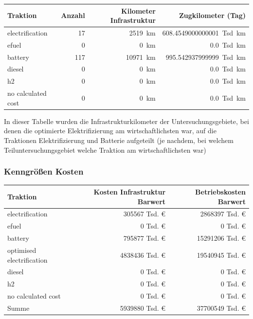 \begin{center}
	\begin{tabularx}{\textwidth}{X | r | r | r} Traktion & Anzahl & Kilometer Infrastruktur & Zugkilometer (Tag) \\
	\hline
            electrification & \num{17} &  \SI{2519}{\km} & \SI{608.4549000000001}{Tsd. \km}\\
            efuel & \num{0} &  \SI{0}{\km} & \SI{0.0}{Tsd. \km}\\
            battery & \num{117} &  \SI{10971}{\km} & \SI{995.542937999999}{Tsd. \km}\\
            diesel & \num{0} &  \SI{0}{\km} & \SI{0.0}{Tsd. \km}\\
            h2 & \num{0} &  \SI{0}{\km} & \SI{0.0}{Tsd. \km}\\
            no calculated cost & \num{0} &  \SI{0}{\km} & \SI{0.0}{Tsd. \km}\\
    	\end{tabularx}
\end{center}
In dieser Tabelle wurden die Infrastrukturkilometer der Untersuchungsgebiete, bei denen die optimierte Elektrifizierung am wirtschaftlichsten war, auf die Traktionen Elektrifizierung und Batterie aufgeteilt (je nachdem, bei welchem Teiluntersuchungsgebiet welche Traktion am wirtschaftlichsten war)

\subsubsection{Kenngrößen Kosten}

\begin{center}
	\begin{tabularx}{\textwidth}{X | r | r} Traktion & Kosten Infrastruktur Barwert & Betriebskosten Barwert\\
	\hline
            electrification & \num{305567} Tsd. € &  \num{2868397} Tsd. €\\
            efuel & \num{0} Tsd. € &  \num{0} Tsd. €\\
            battery & \num{795877} Tsd. € &  \num{15291206} Tsd. €\\
            optimised electrification & \num{4838436} Tsd. € &  \num{19540945} Tsd. €\\
            diesel & \num{0} Tsd. € &  \num{0} Tsd. €\\
            h2 & \num{0} Tsd. € &  \num{0} Tsd. €\\
            no calculated cost & \num{0} Tsd. € &  \num{0} Tsd. €\\
    	\hline
		Summe & \num{5939880} Tsd. € & \num{37700549} Tsd. €
	\end{tabularx}
\end{center}

